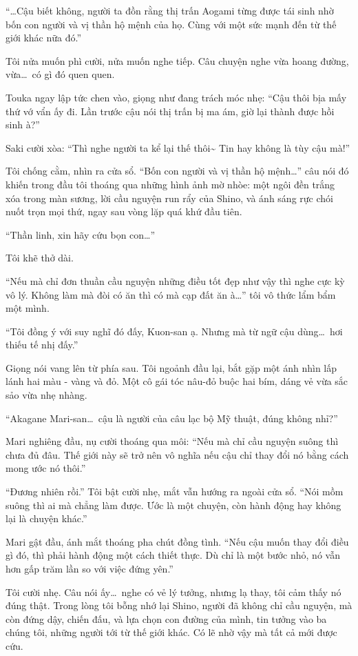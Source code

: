 \documentclass[../main.tex]{subfiles}
\begin{document}
``\dots Cậu biết không, người ta đồn rằng thị trấn Aogami từng được tái sinh nhờ bốn con người và vị thần hộ mệnh của họ. Cùng với một sức mạnh đến từ thế giới khác nữa đó.''

Tôi nửa muốn phì cười, nửa muốn nghe tiếp. Câu chuyện nghe vừa hoang đường, vừa\dots\ có gì đó quen quen.

Touka ngay lập tức chen vào, giọng như đang trách móc nhẹ: ``Cậu thôi bịa mấy thứ vớ vẩn ấy đi. Lần trước cậu nói thị trấn bị ma ám, giờ lại thành được hồi sinh à?''

Saki cười xòa: ``Thì nghe người ta kể lại thế thôi\~{} Tin hay không là tùy cậu mà!''

Tôi chống cằm, nhìn ra cửa sổ. ``Bốn con người và vị thần hộ mệnh\dots'' câu nói đó khiến trong đầu tôi thoáng qua những hình ảnh mờ nhòe: một ngôi đền trắng xóa trong màn sương, lời cầu nguyện run rẩy của Shino, và ánh sáng rực chói nuốt trọn mọi thứ, ngay sau vòng lặp quá khứ đầu tiên.

``Thần linh, xin hãy cứu bọn con\dots''

Tôi khẽ thở dài.

``Nếu mà chỉ đơn thuần cầu nguyện những điều tốt đẹp như vậy thì nghe cực kỳ vô lý. Không làm mà đòi có ăn thì có mà cạp đất ăn à\dots'' tôi vô thức lẩm bẩm một mình.

``Tôi đồng ý với suy nghĩ đó đấy, Kuon-san ạ. Nhưng mà từ ngữ cậu dùng\dots\ hơi thiếu tế nhị đấy.''

Giọng nói vang lên từ phía sau. Tôi ngoảnh đầu lại, bắt gặp một ánh nhìn lấp lánh hai màu - vàng và đỏ. Một cô gái tóc nâu-đỏ buộc hai bím, dáng vẻ vừa sắc sảo vừa nhẹ nhàng.


``Akagane Mari-san\dots\ cậu là người của câu lạc bộ Mỹ thuật, đúng không nhỉ?''

Mari nghiêng đầu, nụ cười thoáng qua môi: ``Nếu mà chỉ cầu nguyện suông thì chưa đủ đâu. Thế giới này sẽ trở nên vô nghĩa nếu cậu chỉ thay đổi nó bằng cách mong ước nó thôi.''

``Đương nhiên rồi.'' Tôi bật cười nhẹ, mắt vẫn hướng ra ngoài cửa sổ. ``Nói mồm suông thì ai mà chẳng làm được. Ước là một chuyện, còn hành động hay không lại là chuyện khác.''

Mari gật đầu, ánh mắt thoáng pha chút đồng tình. ``Nếu cậu muốn thay đổi điều gì đó, thì phải hành động một cách thiết thực. Dù chỉ là một bước nhỏ, nó vẫn hơn gấp trăm lần so với việc đứng yên.''

Tôi cười nhẹ. Câu nói ấy\dots\ nghe có vẻ lý tưởng, nhưng lạ thay, tôi cảm thấy nó đúng thật. Trong lòng tôi bỗng nhớ lại Shino, người đã không chỉ cầu nguyện, mà còn đứng dậy, chiến đấu, và lựa chọn con đường của mình, tin tưởng vào ba chúng tôi, những người tới từ thế giới khác. Có lẽ nhờ vậy mà tất cả mới được cứu.
\end{document}
